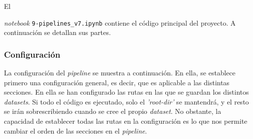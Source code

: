 El {\textit{notebook} \texttt{9-pipelines\_v7.ipynb} contiene el código principal del proyecto. A continuación se detallan sus partes.

\subsubsection{Configuración}

La configuración del \textit{pipeline} se muestra a continuación. En ella, se establece primero una configuración general, es decir, que es aplicable a
las distintas secciones. En ella se han configurado las rutas en las que se guardan los distintos \textit{datasets}. Si todo el código es ejecutado, solo el
\textit{'root-dir'} se mantendrá, y el resto se irán sobrescribiendo cuando se cree el propio \textit{dataset}. No obstante, la capacidad de establecer todas
las rutas en la configuración es lo que nos permite cambiar el orden de las secciones en el \textit{pipeline}. 

}
